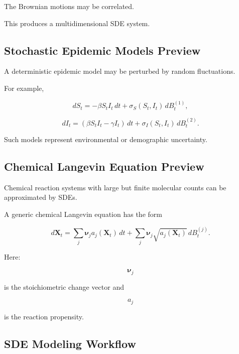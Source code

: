 The Brownian motions may be correlated.

This produces a multidimensional SDE system.

\subsection{Stochastic Epidemic Models Preview}
\label{subsec:stochastic-epidemic-sdes}

A deterministic epidemic model may be perturbed by random fluctuations.

For example,

\[
dS_t
=
-\beta S_tI_t\,dt
+
\sigma_S(S_t,I_t)\,dB_t^{(1)},
\]

\[
dI_t
=
(\beta S_tI_t-\gamma I_t)\,dt
+
\sigma_I(S_t,I_t)\,dB_t^{(2)}.
\]

Such models represent environmental or demographic uncertainty.

\subsection{Chemical Langevin Equation Preview}
\label{subsec:chemical-langevin-preview}

Chemical reaction systems with large but finite molecular counts can be
approximated by SDEs.

A generic chemical Langevin equation has the form

\[
\boxed{
d\mathbf{X}_t
=
\sum_{j}
\boldsymbol{\nu}_j
a_j(\mathbf{X}_t)\,dt
+
\sum_j
\boldsymbol{\nu}_j
\sqrt{
a_j(\mathbf{X}_t)
}
\,dB_t^{(j)}.
}
\]

Here:

\[
\boldsymbol{\nu}_j
\]

is the stoichiometric change vector and

\[
a_j
\]

is the reaction propensity.

\subsection{SDE Modeling Workflow}
\label{subsec:sde-modeling-workflow}

